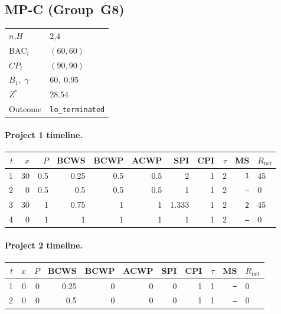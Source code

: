 \documentclass[12pt, a4paper]{article}
\newcommand{\BAC}{\mathrm{BAC}}
\begin{document}
\newpage

\subsection*{MP-C  (Group~G8)}
\begin{center}
\begin{tabular}{ll}
\toprule
$n$,\;$H$ & $2$,\;$4$ \\
$\BAC_i$ & $(60, 60)$ \\
$CP_i$   & $(90, 90)$ \\
$B_1,\;\gamma$ & $60,\;0.95$ \\
$Z^*$ & $28.54$ \\
Outcome & \texttt{lo_terminated} \\
\bottomrule
\end{tabular}
\end{center}

\paragraph{Project 1 timeline.}
\begin{center}
\begin{tabular}{rrrrrrrrrrl}
\toprule
$t$ & $x$ & $P$ & BCWS & BCWP & ACWP & SPI & CPI & $\tau$ & MS & $R_{\mathrm{net}}$\\
\midrule
1 & 30 & 0.5 & 0.25 & 0.5 & 0.5 & 2 & 1 & 2 & \texttt{1} & 45 \\
2 & 0 & 0.5 & 0.5 & 0.5 & 0.5 & 1 & 1 & 2 & \texttt{---} & 0 \\
3 & 30 & 1 & 0.75 & 1 & 1 & 1.333 & 1 & 2 & \texttt{2} & 45 \\
4 & 0 & 1 & 1 & 1 & 1 & 1 & 1 & 2 & \texttt{---} & 0 \\
\bottomrule
\end{tabular}
\end{center}
\paragraph{Project 2 timeline.}
\begin{center}
\begin{tabular}{rrrrrrrrrrl}
\toprule
$t$ & $x$ & $P$ & BCWS & BCWP & ACWP & SPI & CPI & $\tau$ & MS & $R_{\mathrm{net}}$\\
\midrule
1 & 0 & 0 & 0.25 & 0 & 0 & 0 & 1 & 1 & \texttt{---} & 0 \\
2 & 0 & 0 & 0.5 & 0 & 0 & 0 & 1 & 1 & \texttt{---} & 0 \\
\bottomrule
\end{tabular}
\end{center}
\end{document}
